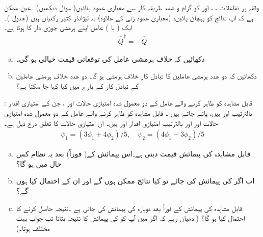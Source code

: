      وقفہ   پر تفاعلات ، ،    اور   کو گرام و  شمد    طریقہ کار  سے معیاری عمود بنائیں( سوال    دیکھیں) ۔عین ممکن ہے کہ آپ نتائج کو پہچان   پائیں؛  (معیاری عمود زنی کے علاوہ) یہ   لیژانڈر کثیر رکنیاں ہیں (جدول  )۔
ایک ( یا   ) عامل   اپنے ہرمشی جوڑی دار کا   ہوتا ہے۔ 
 \begin{align}
 \hat{Q}^{\dagger} = -\hat{Q}
  \end{align}
\begin{enumerate}[a.]
\item
  دکھائیں کہ  خلاف ہرمشی عامل کی   توقعاتی قیمت خیالی ہو گی۔
\item
 دکھائیں کہ دو عدد  ہرمشی عاملین کا تبادل کار خلاف ہرمشی ہو گا۔ دو عدد  خلاف ہرمشی عاملین کے تبادل کار کے بارے میں کیا کہا جا سکتا ہے؟ 
\end{enumerate}
: \quad
قابل مشاہدہ  کو ظاہر کرنے والے  عامل   کے دو معمول شدہ امتیازی حالات اور ، جن کے   امتیازی اقدار بالترتیب  اور ہیں،  پائے جاتے ہیں ۔ قابل مشاہدہ   کو ظاہر کرنے والے عامل  کے دو معمول شدہ امتیازی حالات اور  اور بالترتیب امتیازی اقدار اور  ہیں۔ ان امتیازی حالات کا تعلق درج ذیل ہے۔ 
\begin{align*}
\psi_{1} = ( 3\phi_{1} + 4\phi_{2})/5, \quad \psi_{2} = ( 4\phi_{1} - 3\phi_{2})/5
\end{align*}
\begin{enumerate}[a.]
\item 
 قابل مشاہدہ  کی پیمائش  قیمت دیتی ہے۔اس پیمائش کے( فوراً)  بعد یہ نظام کس حال میں ہو گا؟ 
\item
 اب اگر  کی پیمائش کی جائے تو کیا نتائج ممکن ہوں گے اور ان کے احتمال کیا ہوں گے؟ 
\item
 قابل مشاہدہ  کی پیمائش کے فوراً بعد دوبارہ  کی پیمائش کی جاتی ہے ۔نتیجہ  حاصل کرنے کا احتمال کیا ہو گا؟ ( دھیان رہے  کہ اگر میں آپ کو  کی پیمائش کا نتیجہ بتاتا   تب جواب بہت مختلف ہوتا۔) 
\end{enumerate}
